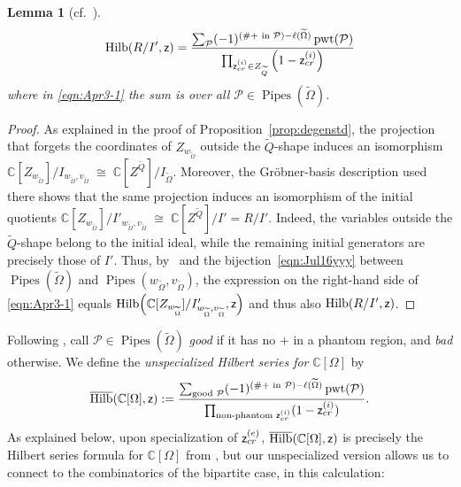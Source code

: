 \documentclass[12pt]{amsart}
\DeclareMathOperator{\tOmega}{\widetilde{\Omega}}
\newtheorem{lemma}[theorem]{Lemma}
\theoremstyle{definition}
\theoremstyle{remark}
\begin{document}
\begin{lemma}[cf.~\cite{WooYong}]
\begin{equation}
\operatorname{Hilb}(R/I',{\sf z}) =  \frac{\sum_{\mathcal P} (-1)^{(\#+ \text{ in ${\mathcal P}$})-\ell({\tOmega})}
\operatorname{pwt}({\mathcal P})}{
\prod_{{\sf z}^{(i)}_{cr}\in Z_{\widetilde Q}}
\left(1-{\sf z}^{(i)}_{cr}\right)}  \label{eqn:Apr3-1}
\end{equation}
where in \eqref{eqn:Apr3-1} the sum is over all ${\mathcal P}\in\operatorname{Pipes}(\widetilde\Omega)$.
\end{lemma}
\begin{proof}
As explained in the proof of Proposition~\ref{prop:degenstd},
the projection that forgets the coordinates of
\(Z_{w_{\widetilde\Omega}}\) outside the \(\widetilde Q\)-shape
induces an isomorphism
$\mathbb C[Z_{w_{\widetilde\Omega}}]/
I_{w_{\widetilde\Omega},v_{\widetilde\Omega}}
\;\cong\;
\mathbb C[Z^{\widetilde Q}]/I_{\widetilde\Omega}$.
Moreover, the Gr\"obner-basis description used there shows that the
same projection induces an isomorphism of the initial quotients
$\mathbb C[Z_{w_{\widetilde\Omega}}]/
I'_{w_{\widetilde\Omega},v_{\widetilde\Omega}}
\;\cong\;
\mathbb C[Z^{\widetilde Q}]/I'
=
R/I'$.
Indeed, the variables outside the \(\widetilde Q\)-shape belong to the
initial ideal, while the remaining initial generators are precisely
those of \(I'\). Thus, by~\cite{WooYong} and the bijection~\eqref{eqn:Jul16yyy}
between
\(\operatorname{Pipes}(\widetilde\Omega)\) and
\(\operatorname{Pipes}(w_{\widetilde\Omega},
v_{\widetilde\Omega})\), the expression on the right-hand side of
\eqref{eqn:Apr3-1} equals
$\operatorname{Hilb}\!\left(
\mathbb C[Z_{w_{\widetilde\Omega}}]/
I'_{w_{\widetilde\Omega},v_{\widetilde\Omega}},
{\sf z}
\right)$ and thus also $\operatorname{Hilb}(R/I',{\sf z})$.
\end{proof}
 
Following \cite{KKR}, call ${\mathcal P}\in\operatorname{Pipes}(\widetilde\Omega)$ 
\emph{good} if it has no $+$ in a phantom region, and \emph{bad} otherwise.
We define the \emph{unspecialized Hilbert series for} ${\mathbb C}[\Omega]$ by
\begin{equation}\label{eqn:Apr3-3}
\overline{\operatorname{Hilb}}({\mathbb C}[\Omega],{\sf z}):=\frac{\sum_{\text{good ${\mathcal P}$}}
(-1)^{(\#+ \text{ in ${\mathcal P}$})-\ell({\tOmega})}
\operatorname{pwt}({\mathcal P})}{\prod_{\text{non-phantom ${\sf z}_{cr}^{(i)}$}} (1-{\sf z}_{cr}^{(i)})}. 
\end{equation}
As explained below, upon specialization of ${\sf z}_{cr}^{(e)}$,  $\overline{\operatorname{Hilb}}({\mathbb C}[\Omega],{\sf z})$ is precisely the Hilbert series formula for ${\mathbb C}[\Omega]$ from \cite{KKR}, but our unspecialized
version allows us to connect to the combinatorics of the bipartite case, in this calculation:
\end{document}
